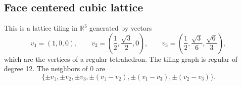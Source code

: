 \documentclass[a4paper, 12pt, notitlepage]{amsart}
\newcommand{\bR}{\mathbb{R}}
\theoremstyle{remark}
\begin{document}
\subsection{Face centered cubic lattice} This is a lattice tiling in $\bR^3$ generated by vectors 
\begin{equation}
 v_1 = \left(1,0,0 \right), \qquad v_2 = \left(\frac{1}{2}, \frac{\sqrt{3}}{2},0 \right), \qquad v_3 = \left(\frac{1}{2}, \frac{\sqrt{3}}{6}, \frac{\sqrt{6}}{3} \right),
\end{equation}
which are the vertices of a regular tetrahedron.  The tiling graph is regular of degree 12.  The neighbors of 0 are
\begin{equation}
 \{ \pm v_1, \pm v_2, \pm v_3, \pm(v_1-v_2), \pm (v_1-v_3), \pm (v_2-v_3)\}.
\end{equation}
\end{document}
